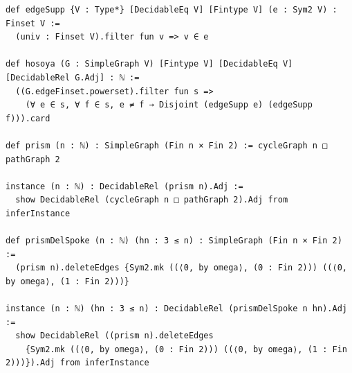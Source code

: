 \documentclass[11pt]{article}
\theoremstyle{definition}
\begin{document}
\begin{lstlisting}[caption={Frozen base definitions, verbatim lines 45--62 of
\texttt{formalized/statement.lean} (sha256 \texttt{d186ff16}): edgeSupp,
hosoya, prism, prismDelSpoke and their decidability instances.},label={lst:s1}]
def edgeSupp {V : Type*} [DecidableEq V] [Fintype V] (e : Sym2 V) : Finset V :=
  (univ : Finset V).filter fun v => v ∈ e

def hosoya (G : SimpleGraph V) [Fintype V] [DecidableEq V] [DecidableRel G.Adj] : ℕ :=
  ((G.edgeFinset.powerset).filter fun s =>
    (∀ e ∈ s, ∀ f ∈ s, e ≠ f → Disjoint (edgeSupp e) (edgeSupp f))).card

def prism (n : ℕ) : SimpleGraph (Fin n × Fin 2) := cycleGraph n □ pathGraph 2

instance (n : ℕ) : DecidableRel (prism n).Adj :=
  show DecidableRel (cycleGraph n □ pathGraph 2).Adj from inferInstance

def prismDelSpoke (n : ℕ) (hn : 3 ≤ n) : SimpleGraph (Fin n × Fin 2) :=
  (prism n).deleteEdges {Sym2.mk ((⟨0, by omega⟩, (0 : Fin 2))) ((⟨0, by omega⟩, (1 : Fin 2)))}

instance (n : ℕ) (hn : 3 ≤ n) : DecidableRel (prismDelSpoke n hn).Adj :=
  show DecidableRel ((prism n).deleteEdges
    {Sym2.mk ((⟨0, by omega⟩, (0 : Fin 2))) ((⟨0, by omega⟩, (1 : Fin 2)))}).Adj from inferInstance
\end{lstlisting}
\end{document}
